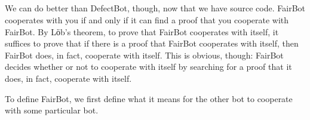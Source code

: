 \begin{code}%
\>  \<[16]%
\>[16]\AgdaSymbol{=}  \AgdaSymbol{(} \AgdaSymbol{(}   \AgdaSymbol{))}\<%
\\
\>  \AgdaSymbol{=}  \AgdaSymbol{(} \AgdaSymbol{(}   \AgdaSymbol{))}\<%
\\
%
\\
\>  \AgdaSymbol{:}  \AgdaSymbol{\{}\AgdaSymbol{\}}\<%
\\
\>[0]\<[3]%
\>[3]      \<%
\\
\>  \AgdaSymbol{\{}\AgdaSymbol{\}}  \AgdaSymbol{=} \<%
\\
%
\\
\>  \AgdaSymbol{:}  \AgdaSymbol{\{}\AgdaSymbol{\}}\<%
\\
\>[0]\<[3]%
\>[3]     \<%
\\
\>  \AgdaSymbol{\{}\AgdaSymbol{\}} \AgdaSymbol{=} \<%
\end{code}

  We can do better than DefectBot, though, now that we have source
  code.  FairBot cooperates with you if and only if it can find a
  proof that you cooperate with FairBot.  By Lӧb's theorem, to prove
  that FairBot cooperates with itself, it suffices to prove that if
  there is a proof that FairBot cooperates with itself, then FairBot
  does, in fact, cooperate with itself.  This is obvious, though:
  FairBot decides whether or not to cooperate with itself by searching
  for a proof that it does, in fact, cooperate with itself.

  To define FairBot, we first define what it means for the other bot
  to cooperate with some particular bot.

